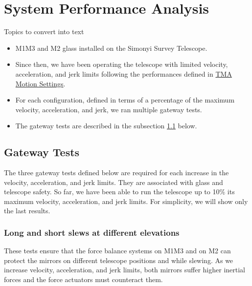 \section{System Performance Analysis}
\label{sec:system_performance_analysis}

\newcommand{\TMAMotionSettings}{\href{https://rubinobs.atlassian.net/wiki/spaces/LSSTCOM/pages/53741249/TMA+Motion+Settings}{TMA Motion Settings}}

Topics to convert into text

\begin{itemize}
    \item M1M3 and M2 glass installed on the Simonyi Survey Telescope.
    \item Since then, we have been operating the telescope with limited velocity,
    acceleration, and jerk limits following the performances defined in \TMAMotionSettings.
    \item For each configuration, defined in terms of a percentage of the maximum
    velocity, acceleration, and jerk, we ran multiple gateway tests.
    \item The gateway tests are described in the subsection \ref{subsec:gateway_tests} below.
\end{itemize}

\subsection{Gateway Tests}
\label{subsec:gateway_tests}

The three gateway tests defined below are required for each increase in the
velocity, acceleration, and jerk limits. They are associated with glass and
telescope safety. So far, we have been able to run the telescope up to 10\%
its maximum velocity, acceleration, and jerk limits. For simplicity, we will
show only the last results.


\subsubsection{Long and short slews at different elevations}
\label{subsubsec:long_and_short_slews}

These tests ensure that the force balance systems on M1M3 and on M2 can protect
the mirrors on different telescope positions and while slewing. As we increase
velocity, acceleration, and jerk limits, both mirrors suffer higher inertial
forces and the force actuators must counteract them.

